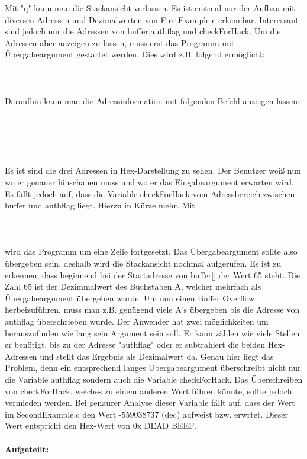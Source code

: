 Mit "q" kann man die Stackansicht verlassen. Es ist erstmal nur der Aufbau mit diversen Adressen und Dezimalwerten von FirstExample.c erkennbar. Interessant sind jedoch nur die Adressen von buffer,authflag und checkForHack. Um die Adressen aber anzeigen zu lassen, muss erst das Programm mit Übergabeargument gestartet werden. Dies wird z.B. folgend ermöglicht:\\\\\\\\Daraufhin kann man die Adressinformation mit folgenden Befehl anzeigen lassen:\\\\ \\ \\ \\\\Es ist sind die drei Adressen in Hex-Darstellung zu sehen. Der Benutzer weiß nun wo er genauer hinschauen muss und wo er das Eingabeargument erwarten wird. Es fällt jedoch auf, dass die Variable checkForHack vom Adressbereich zwischen buffer und authflag liegt. Hierzu in Kürze mehr. Mit\\\\ \\\\wird das Programm um eine Zeile fortgesetzt. Das Übergabeargument sollte also übergeben sein, deshalb wird die Stackansicht nochmal aufgerufen. Es ist zu erkennen, dass beginnend bei der Startadresse von buffer[] der Wert 65 steht. Die Zahl 65 ist der Dezimmalwert des Buchstaben A, welcher mehrfach als Übergabeargument übergeben wurde. Um nun einen Buffer Overflow herbeizuführen, muss man z.B. genügend viele A's übergeben bis die Adresse von authflag überschrieben wurde. Der Anwender hat zwei möglichkeiten um herauszufinden wie lang sein Argument sein soll. Er kann zählen wie viele Stellen er benötigt, bis zu der Adresse "authflag" oder er subtrahiert die beiden Hex-Adressen und stellt das Ergebnis als Dezimalwert da. Genau hier liegt das Problem, denn ein entsprechend langes Übergabeargument überschreibt nicht nur die Variable authflag sondern auch die Variable checkForHack. Das Überschreiben von checkForHack, welches zu einem anderen Wert führen könnte, sollte jedoch vermieden werden. Bei genaurer Analyse dieser Variable fällt auf, dass der Wert im SecondExample.c den Wert -559038737 (dec) aufweist bzw. erwrtet. Dieser Wert entspricht den Hex-Wert von 0x DEAD BEEF.\\\\ \textbf{Aufgeteilt:} 
